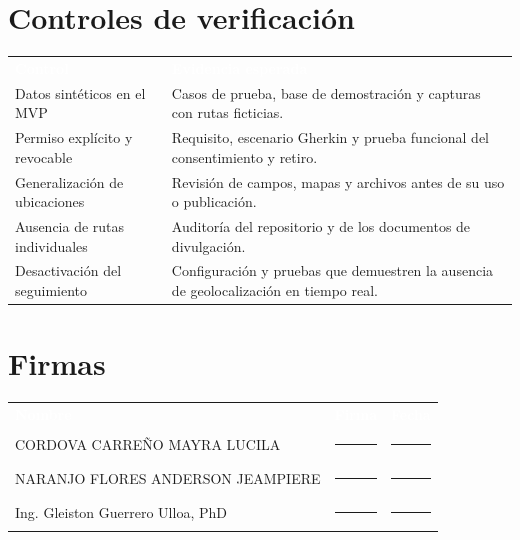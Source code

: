 \documentclass[10pt,a4paper]{article}
\newcommand{\Mayra}{CORDOVA CARREÑO MAYRA LUCILA}
\newcommand{\Anderson}{NARANJO FLORES ANDERSON JEAMPIERE}
\newcommand{\Docente}{Ing. Gleiston Guerrero Ulloa, PhD}
\begin{document}
\section{Controles de verificación}

\noindent\begin{tabularx}{\textwidth}{L{5.0cm} Y}
\textcolor{white}{\textbf{Control}} & \textcolor{white}{\textbf{Evidencia esperada}}\\
Datos sintéticos en el MVP & Casos de prueba, base de demostración y capturas con rutas ficticias.\\
Permiso explícito y revocable & Requisito, escenario Gherkin y prueba funcional del consentimiento y retiro.\\
Generalización de ubicaciones & Revisión de campos, mapas y archivos antes de su uso o publicación.\\
Ausencia de rutas individuales & Auditoría del repositorio y de los documentos de divulgación.\\
Desactivación del seguimiento & Configuración y pruebas que demuestren la ausencia de geolocalización en tiempo real.\\
\end{tabularx}

\section{Firmas}

\vspace{0.25cm}
\noindent\begin{tabularx}{\textwidth}{Y C{4.1cm} C{2.9cm}}
\textcolor{white}{\textbf{Nombre}} &
\textcolor{white}{\textbf{Firma}} &
\textcolor{white}{\textbf{Fecha}}\\
\Mayra & \rule{3.7cm}{0.4pt} & \rule{2.4cm}{0.4pt}\\[4pt]
\Anderson & \rule{3.7cm}{0.4pt} & \rule{2.4cm}{0.4pt}\\[4pt]
\Docente & \rule{3.7cm}{0.4pt} & \rule{2.4cm}{0.4pt}\\
\end{tabularx}
\end{document}
